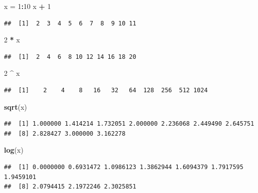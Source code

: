 \documentclass[]{book}
\newenvironment{Shaded}{\begin{snugshade}}{\end{snugshade}}
\newcommand{\KeywordTok}[1]{\textcolor[rgb]{0.13,0.29,0.53}{\textbf{#1}}}
\newcommand{\DecValTok}[1]{\textcolor[rgb]{0.00,0.00,0.81}{#1}}
\newcommand{\StringTok}[1]{\textcolor[rgb]{0.31,0.60,0.02}{#1}}
\newcommand{\OperatorTok}[1]{\textcolor[rgb]{0.81,0.36,0.00}{\textbf{#1}}}
\newcommand{\NormalTok}[1]{#1}
\begin{document}
\begin{Shaded}
\begin{Highlighting}[]
\NormalTok{x =}\StringTok{ }\DecValTok{1}\OperatorTok{:}\DecValTok{10}
\NormalTok{x }\OperatorTok{+}\StringTok{ }\DecValTok{1}
\end{Highlighting}
\end{Shaded}

\begin{verbatim}
##  [1]  2  3  4  5  6  7  8  9 10 11
\end{verbatim}

\begin{Shaded}
\begin{Highlighting}[]
\DecValTok{2} \OperatorTok{*}\StringTok{ }\NormalTok{x}
\end{Highlighting}
\end{Shaded}

\begin{verbatim}
##  [1]  2  4  6  8 10 12 14 16 18 20
\end{verbatim}

\begin{Shaded}
\begin{Highlighting}[]
\DecValTok{2} \OperatorTok{^}\StringTok{ }\NormalTok{x}
\end{Highlighting}
\end{Shaded}

\begin{verbatim}
##  [1]    2    4    8   16   32   64  128  256  512 1024
\end{verbatim}

\begin{Shaded}
\begin{Highlighting}[]
\KeywordTok{sqrt}\NormalTok{(x)}
\end{Highlighting}
\end{Shaded}

\begin{verbatim}
##  [1] 1.000000 1.414214 1.732051 2.000000 2.236068 2.449490 2.645751
##  [8] 2.828427 3.000000 3.162278
\end{verbatim}

\begin{Shaded}
\begin{Highlighting}[]
\KeywordTok{log}\NormalTok{(x)}
\end{Highlighting}
\end{Shaded}

\begin{verbatim}
##  [1] 0.0000000 0.6931472 1.0986123 1.3862944 1.6094379 1.7917595 1.9459101
##  [8] 2.0794415 2.1972246 2.3025851
\end{verbatim}
\end{document}
